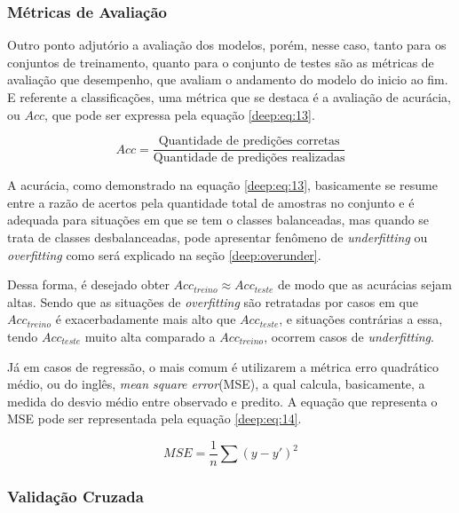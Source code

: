 \subsubsection{Métricas de Avaliação}
\label{deep:metrics}

Outro ponto adjutório a avaliação dos modelos, porém, nesse caso, tanto para os conjuntos de treinamento, quanto para o conjunto de testes são as métricas de avaliação que desempenho, que avaliam o andamento do modelo do inicio ao fim. E referente a classificações, uma métrica que se destaca é a avaliação de acurácia, ou $Acc$, que pode ser expressa pela equação \ref{deep:eq:13}.

\begin{equation}
    \label{deep:eq:13}
    Acc = \frac{\text{Quantidade de predições corretas}}{\text{Quantidade de predições realizadas}}
\end{equation}

A acurácia, como demonstrado na equação \ref{deep:eq:13}, basicamente se resume entre a razão de acertos pela quantidade total de amostras no conjunto e é adequada para situações em que se tem o classes balanceadas, mas quando se trata de classes desbalanceadas, pode apresentar fenômeno de \textit{underfitting} ou \textit{overfitting} como será explicado na seção \ref{deep:overunder}.

Dessa forma, é desejado obter $Acc_{treino} \approx Acc_{teste}$ de modo que as acurácias sejam altas. Sendo que as situações de \textit{overfitting} são retratadas por casos em que $Acc_{treino}$ é exacerbadamente mais alto que $Acc_{teste}$, e situações contrárias a essa, tendo $Acc_{teste}$ muito alta comparado a $Acc_{treino}$, ocorrem casos de \textit{underfitting}.

Já em casos de regressão, o mais comum é utilizarem a métrica erro quadrático médio, ou do inglês, \textit{mean square error}(MSE), a qual calcula, basicamente, a medida do desvio médio entre observado e predito. A equação que representa o MSE pode ser representada pela equação \ref{deep:eq:14}.

\begin{equation}
    \label{deep:eq:14}
    MSE = \frac{1}{n} \sum(y - y')^2
\end{equation}


\subsubsection{Validação Cruzada}
\label{deep:cross}

